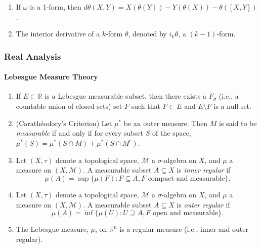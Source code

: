\documentclass{article}
\begin{document}
\begin{enumerate}[start = 29]
\begin{enumerate}[itemsep =-2pt,label = (\arabic{*})]
			\item $d\mathscr{L}_{X}\omega = \mathscr{L}_{X}(d\omega)$. 
			\item $\mathscr{L}_{fX}\omega = f\mathscr{L}_{X}\omega + df\wedge i_{X}\omega$. 
			\item If $X$, $Y$ are vector fields,  then $\mathscr{L}_{X}Y = [X, Y]$. 
			\item $[\mathscr{L}_{X}, \mathscr{L}_{Y}] = \mathscr{L}_{[X,Y]}$. 
		\end{enumerate}
	\item If $\omega$ is a 1-form, then $d\theta(X,Y)= X(\theta(Y)) - Y(\theta(X))- \theta([X,Y])$.
	\item The interior derivative of a $k$-form $\theta$, denoted by $i_{V}\theta$, a $(k - 1)$-form. 
	\end{enumerate}
	
	\subsubsection{Real Analysis}
	\paragraph{Lebesgue Measure Theory}
\begin{enumerate}[series=real_analysis]
	\item If $E \subset \mathbb{R}$ is a Lebesgue measurable subset, then there exists a $F_{\sigma}$ (i.e., a countable union of closed sets) set $F$ such that $F \subset E$ and $E\setminus F$ is a null set. 
	\item (Carath\'eodory's Criterion) Let $\mu^{\ast}$ be an outer measure. Then $M$ is said to be \textit{measurable} if and only if for every subset $S$ of the space, $\mu^{\ast}(S) = \mu^{\ast}(S \cap M) + \mu^{\ast}(S \cap M^{c})$. 
	\item Let $(X, \tau)$ denote a topological space, $\mathcal{M}$ a $\sigma$-algebra on $X$, and $\mu$ a measure on $(X, \mathcal{M})$. A measurable subset $A \subseteq X$ is \textit{inner regular} if 
	\begin{equation*}
		\mu(A) = \sup\{\mu(F): F \subseteq A, F \text{ compact and measurable}\}.
	\end{equation*}
	\item Let $(X, \tau)$ denote a topological space, $\mathcal{M}$ a $\sigma$-algebra on $X$, and $\mu$ a measure on $(X, \mathcal{M})$. A measurable subset $A \subseteq X$ is \textit{outer regular} if 
	\begin{equation*}
		\mu(A) = \inf\{\mu(U): U \supseteq A, F \text{ open and measurable}\}.
	\end{equation*}
	\item The Lebesgue measure, $\mu$, on $\mathbb{R}^{n}$ is a regular measure (i.e., inner and outer regular).
	
\end{enumerate}
\end{document}
